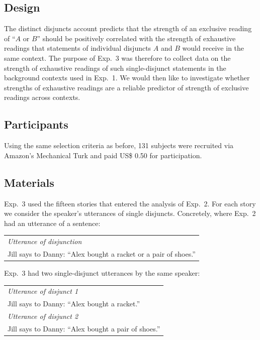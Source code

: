 \documentclass[12pt]{article}
\begin{document}
\subsection*{Design}

The distinct disjuncts account predicts that the strength of an exclusive reading of ``$A$ or $B$'' should be positively correlated with the strength of exhaustive readings that statements of individual disjuncts $A$ and $B$ would receive in the same context. The purpose of Exp.~3 was therefore to collect data on the strength of
exhaustive readings of such single-disjunct statements in the background contexts used in
Exp.~1. We would then like to investigate whether strengths of exhaustive readings are a
reliable predictor of strength of exclusive readings across contexts.

\subsection*{Participants}

Using the same selection criteria as before, 131 subjects were recruited via Amazon's
Mechanical Turk and paid US\$ 0.50 for participation.

\subsection*{Materials}

Exp.~3 used the fifteen stories that entered the analysis of Exp.~2. For each story we consider
the speaker's utterances of single disjuncts. Concretely, where Exp.~2 had an utterance of a
sentence:

\begin{center}
\begin{tabular}{p{10cm}}
  \emph{Utterance of disjunction}\\
  Jill says to Danny: ``Alex bought a racket or a pair of shoes.''
\end{tabular}
\end{center}

\noindent Exp.~3 had two single-disjunct utterances by the same speaker:

\begin{center}
\begin{tabular}{p{10cm}}
  \emph{Utterance of disjunct 1}\\
  Jill says to Danny: ``Alex bought a racket.'' \\[.2cm]
  \emph{Utterance of disjunct 2}\\
  Jill says to Danny: ``Alex bought a pair of shoes.''
\end{tabular}
\end{center}
\end{document}

